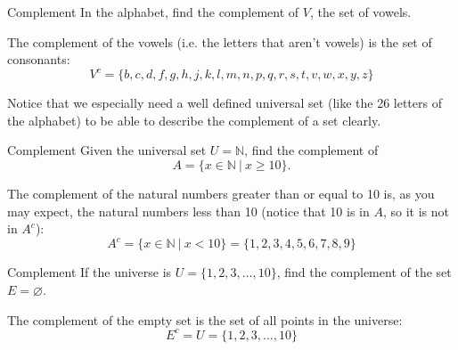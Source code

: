 \begin{example}{Complement}
In the alphabet, find the complement of $V$, the set of vowels.

\sol
The complement of the vowels (i.e. the letters that aren't vowels) is the set of consonants:
\[\boxed{V^c = \{b,c,d,f,g,h,j,k,l,m,n,p,q,r,s,t,v,w,x,y,z\}}\]

Notice that we especially need a well defined universal set (like the 26 letters of the alphabet) to be able to describe the complement of a set clearly.
\end{example}

\begin{example}{Complement}
Given the universal set $U = \mathbb{N}$, find the complement of \[A = \{x \in \mathbb{N}\ |\ x \geq 10\}.\]

\sol
The complement of the natural numbers greater than or equal to 10 is, as you may expect, the natural numbers less than 10 (notice that 10 is in $A$, so it is not in $A^c$):
\[\boxed{A^c = \{x \in \mathbb{N}\ |\ x < 10\} = \{1,2,3,4,5,6,7,8,9\}}\]
\end{example}

\begin{example}{Complement}
If the universe is $U = \{1,2,3,\ldots,10\}$, find the complement of the set $E=\varnothing$.

\sol
The complement of the empty set is the set of all points in the universe:
\[\boxed{E^c = U = \{1,2,3,\ldots,10\}}\]
\end{example}
\pagebreak

